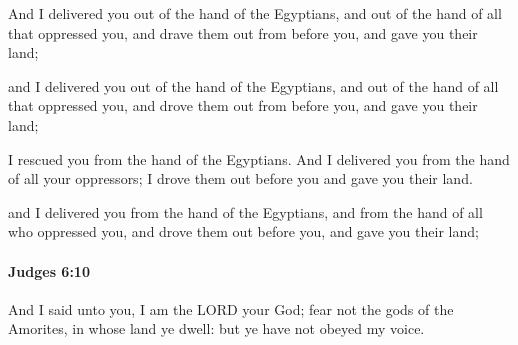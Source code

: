 			And I delivered you out of the hand of the Egyptians, and out of the hand of all that oppressed you, and drave them out from before you, and gave you their land;

			\begin{versebox}
					\item[BHS] 
					\item[ASV] and I delivered you out of the hand of the Egyptians, and out of the hand of all that oppressed you, and drove them out from before you, and gave you their land;
					\item[NIV] I rescued you from the hand of the Egyptians. And I delivered you from the hand of all your oppressors; I drove them out before you and gave you their land.
					\item[NRSV] and I delivered you from the hand of the Egyptians, and from the hand of all who oppressed you, and drove them out before you, and gave you their land;
			\end{versebox}

		\paragraph{Judges 6:10} %
			\label{JUDGES-6-10}

			And I said unto you, I am the LORD your God; fear not the gods of the Amorites, in whose land ye dwell: but ye have not obeyed my voice.

